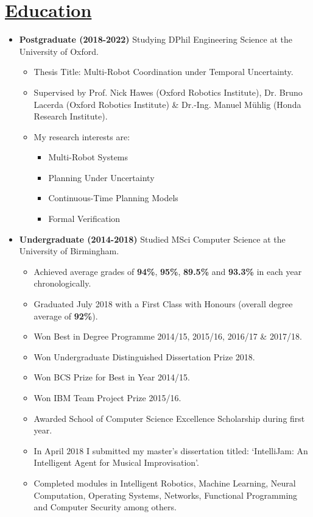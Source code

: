 \documentclass[11pt]{article}
\begin{document}
	\vspace{-30pt}
	\hspace{-100pt}\section*{\underline{Education}}
		\begin {itemize}
			\item \textbf{Postgraduate (2018-2022)} Studying DPhil Engineering Science at the University of Oxford.
				\begin{itemize}
					\item Thesis Title: Multi-Robot Coordination under Temporal Uncertainty.
					\item Supervised by Prof. Nick Hawes (Oxford Robotics Institute), Dr. Bruno Lacerda (Oxford Robotics Institute) \& Dr.-Ing. Manuel M{\"u}hlig (Honda Research Institute).
					\item My research interests are:
					    \begin{itemize}
					        \item Multi-Robot Systems
					        \item Planning Under Uncertainty
					        \item Continuous-Time Planning Models
					        \item Formal Verification
					    \end{itemize}
				\end{itemize}
		
			\item \textbf{Undergraduate (2014-2018)} Studied MSci Computer Science at the University of Birmingham.
				\begin{itemize}
					\item Achieved average grades of \textbf{94\%}, \textbf{95\%}, \textbf{89.5\%} and \textbf{93.3\%} in each year chronologically.
					\item Graduated July 2018 with a First Class with Honours (overall degree average of \textbf{92\%}).
					\item Won Best in Degree Programme 2014/15, 2015/16, 2016/17 \& 2017/18.
					\item Won Undergraduate Distinguished Dissertation Prize 2018.
					\item Won BCS Prize for Best in Year 2014/15.
					\item Won IBM Team Project Prize 2015/16.
					\item Awarded School of Computer Science Excellence Scholarship during first year.
					\item In April $2018$ I submitted my master's dissertation titled: `IntelliJam: An Intelligent Agent for Musical Improvisation'.
					\item Completed modules in Intelligent Robotics, Machine Learning, Neural Computation, Operating Systems, Networks, Functional Programming and Computer Security among others.
				\end{itemize}
			
		\end{itemize}
		
\end{document}
